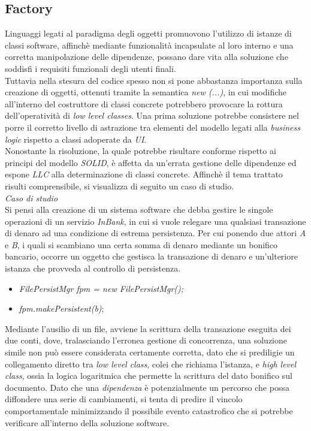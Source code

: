 \documentclass{article}
\begin{document}
\subsection*{Factory}
\large
Linguaggi legati al paradigma degli oggetti promuovono l'utilizzo di istanze di classi software, affinchè mediante funzionalità incapsulate al loro interno e una corretta manipolazione delle dipendenze, possano dare vita alla soluzione che soddisfi i requisiti funzionali degli utenti finali.\vspace*{14pt}\\
Tuttavia nella stesura del codice spesso non si pone abbastanza importanza sulla creazione di oggetti, ottenuti tramite la semantica \textit{new (...)}, in cui modifiche all'interno del costruttore di classi concrete potrebbero provocare la rottura dell'operatività di \textit{low level classes}. Una prima soluzione potrebbe consistere nel porre il corretto livello di astrazione tra elementi del modello legati alla \textit{business logic} rispetto a classi adoperate da \textit{UI}.\vspace*{14pt}\\
Nonostante la risoluzione, la quale potrebbe risultare conforme rispetto ai principi del modello \textit{SOLID}, è affetta da un'errata gestione delle dipendenze ed espone \textit{LLC} alla determinazione di classi concrete. Affinchè il tema trattato risulti comprensibile, si visualizza di seguito un caso di studio.\vspace*{14pt}\\
\textit{Caso di studio}\\
Si pensi alla creazione di un sistema software che debba gestire le singole operazioni di un servizio \textit{InBank}, in cui si vuole relegare una qualsiasi transazione di denaro ad una condizione di estrema persistenza. Per cui ponendo due attori \textit{A} e \textit{B}, i quali si scambiano una certa somma di denaro mediante un bonifico bancario, occorre un oggetto che gestisca la transazione di denaro e un'ulteriore istanza che provveda al controllo di persistenza. 
\begin{itemize}[label={ }, leftmargin=1cm]
    \itemsep0em
    \item \textit{FilePersistMgr fpm = new FilePersistMgr();}
    \item \textit{fpm.makePersistent(b)};
\end{itemize} 
Mediante l'ausilio di un file, avviene la scrittura della transazione eseguita dei due conti, dove, tralasciando l'erronea gestione di concorrenza, una soluzione simile non può essere considerata certamente corretta, dato che si prediligie un collegamento diretto tra \textit{low level class}, colei che richiama l'istanza, e \textit{high level class}, ossia la logica logaritmica che permette la scrittura del dato bonifico sul documento. Dato che una \textit{dipendenza} è potenzialmente un percorso che possa diffondere una serie di cambiamenti, si tenta di predire il vincolo comportamentale minimizzando il possibile evento catastrofico che si potrebbe verificare all'interno della soluzione software.\vspace*{14pt}\\
\end{document}
